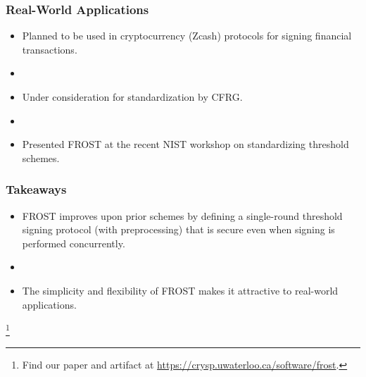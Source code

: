\documentclass[hyperref={pdfpagelabels=true},table,dvipsnames,14pt,aspectratio=169]{beamer}
\begin{document}
\begin{frame}
  \frametitle{Real-World Applications}

  \begin{itemize}
    \item<1-> Planned to be used in cryptocurrency (Zcash) protocols for
      signing financial transactions.
    \item[]
    \item<2-> Under consideration for standardization by CFRG.
    \item[]
    \item<3-> Presented FROST at the recent NIST workshop on standardizing
      threshold schemes.
  \end{itemize}
\end{frame}

\begin{frame}
  \frametitle{Takeaways}
  \begin{itemize}
    \item<1-> FROST improves upon prior schemes by defining a
      single-round threshold signing protocol (with preprocessing) that is
      secure even when signing is performed concurrently.
    \item[]
    \item<2-> The simplicity and flexibility of FROST makes it attractive to
      real-world applications.
  \end{itemize}
      \let\thefootnote\relax\footnote{
      Find our paper and artifact at
      \url{https://crysp.uwaterloo.ca/software/frost}.
      }
\end{frame}

\end{document}
